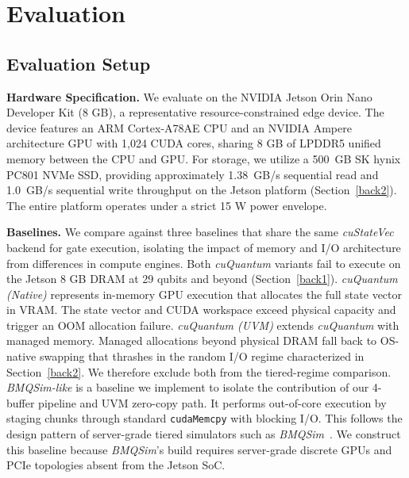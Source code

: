 \section{Evaluation}
\label{sec:eval}

\subsection{Evaluation Setup}\label{setup} 

\noindent\textbf{Hardware Specification.} We evaluate \EdgeQuantum on the NVIDIA Jetson Orin Nano Developer Kit (8 GB), a representative resource-constrained edge device. The device features an ARM Cortex-A78AE CPU and an NVIDIA Ampere architecture GPU with 1,024 CUDA cores, sharing 8 GB of LPDDR5 unified memory between the CPU and GPU. For storage, we utilize a 500~GB SK hynix PC801 NVMe SSD, providing approximately 1.38~GB/s sequential read and 1.0~GB/s sequential write throughput on the Jetson platform (Section~\ref{back2}). The entire platform operates under a strict 15 W power envelope. 

\noindent\textbf{Baselines.} We compare \EdgeQuantum against three baselines that share the same \textit{cuStateVec} backend for gate execution, isolating the impact of memory and I/O architecture from differences in compute engines. Both \textit{cuQuantum} variants fail to execute on the Jetson 8 GB DRAM at 29 qubits and beyond (Section~\ref{back1}). \textit{cuQuantum (Native)} represents in-memory GPU execution that allocates the full state vector in VRAM. The state vector and CUDA workspace exceed physical capacity and trigger an OOM allocation failure. \textit{cuQuantum (UVM)} extends \textit{cuQuantum} with managed memory. Managed allocations beyond physical DRAM fall back to OS-native swapping that thrashes in the random I/O regime characterized in Section~\ref{back2}. We therefore exclude both from the tiered-regime comparison. \textit{BMQSim-like} is a baseline we implement to isolate the contribution of our 4-buffer pipeline and UVM zero-copy path. It performs out-of-core execution by staging chunks through standard \texttt{cudaMemcpy} with blocking I/O. This follows the design pattern of server-grade tiered simulators such as \textit{BMQSim}~\cite{zhang2025bmqsim}. We construct this baseline because \textit{BMQSim}'s build requires server-grade discrete GPUs and PCIe topologies absent from the Jetson SoC.

